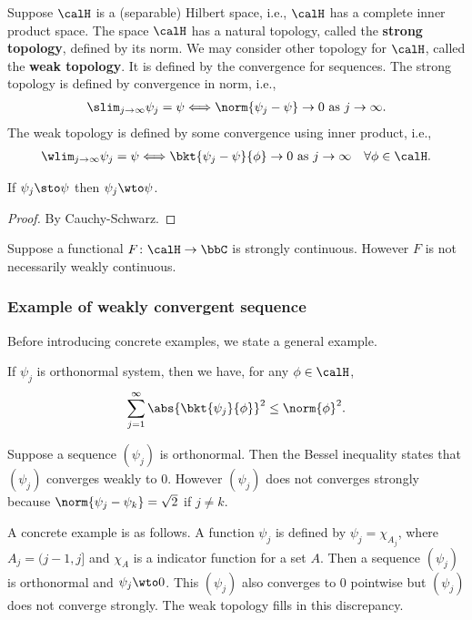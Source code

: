 \documentclass[openany, a4paper, oneside]{jsbook}
\begin{document}
Suppose $\calH$ is a (separable) Hilbert space, i.e., $\calH$ has a complete inner product space.
The space $\calH$ has a natural topology, called the \textbf{strong topology}, defined by its norm.
We may consider other topology for $\calH$, called the \textbf{weak topology}.
It is defined by the convergence for sequences.
The strong topology is defined by convergence in norm, i.e.,
\begin{align}
 \slim_{j \to \infty} \psi_j = \psi
 \Longleftrightarrow
 \norm{\psi_j - \psi} \to 0 \text{ as } j \to \infty.
\end{align}
The weak topology is defined by some convergence using inner product, i.e.,
\begin{align}
 \wlim_{j \to \infty} \psi_j = \psi
 \Longleftrightarrow
 \bkt{\psi_j - \psi}{\phi} \to 0 \text{ as } j \to \infty \quad \forall \phi \in \calH.
\end{align}
\begin{prop}
 If $\psi_j \sto \psi$ then $\psi_j \wto \psi$.
\end{prop}
\begin{proof}
By Cauchy-Schwarz.
\end{proof}
\begin{rem}
 Suppose a functional $F \colon \calH \to \bbC$ is strongly continuous.
 However $F$ is not necessarily weakly continuous.
\end{rem}

\subsubsection{Example of weakly convergent sequence}

Before introducing concrete examples, we state a general example.
\begin{thm}
 If $\psi_j$ is orthonormal system, then we have, for any $\phi \in \calH$,
 \begin{align}
  \sum_{j = 1}^{\infty} \abs{\bkt{\psi_j}{\phi}}^2
  \leq
  \norm{\phi}^2.
 \end{align}
\end{thm}
Suppose a sequence $(\psi_j)$ is orthonormal.
Then the Bessel inequality states that $(\psi_j)$ converges weakly to 0.
However $(\psi_j)$ does not converges strongly because $\norm{\psi_j - \psi_k} = \sqrt{2}$ if $j \neq k$.

A concrete example is as follows.
A function $\psi_j$ is defined by $\psi_j = \chi_{A_j}$, where $A_j = (j-1, j]$ and $\chi_A$ is a indicator function for a set $A$.
Then a sequence $(\psi_j)$ is orthonormal and $\psi_j \wto 0$.
This $(\psi_j)$ also converges to $0$ pointwise but $(\psi_j)$ does not converge strongly.
The weak topology fills in this discrepancy.
\end{document}
